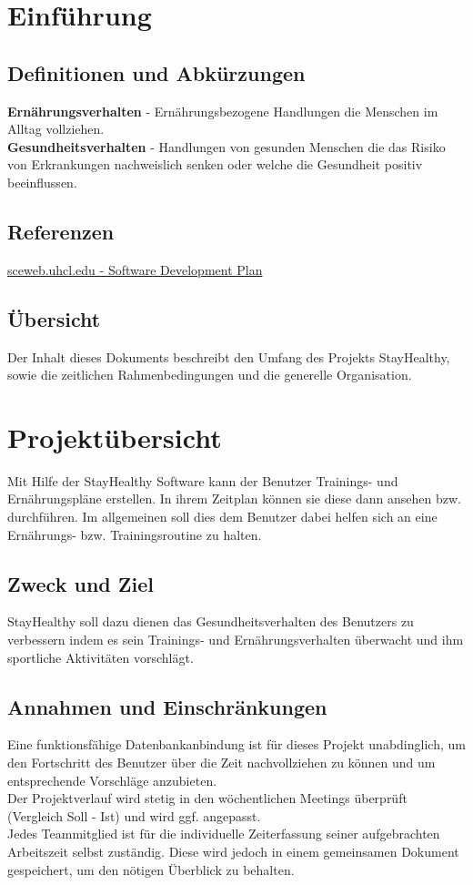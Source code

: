 \documentclass[12pt,a4paper,onecolumn]{article}
\begin{document}
\section{Einführung}
\subsection{Definitionen und Abkürzungen}
\textbf{Ernährungsverhalten} - Ernährungsbezogene Handlungen die Menschen im Alltag vollziehen.\\
\textbf{Gesundheitsverhalten} - Handlungen von gesunden Menschen die das Risiko von Erkrankungen nachweislich senken oder welche die Gesundheit positiv beeinflussen.
\subsection{Referenzen}
\href{https://sceweb.uhcl.edu/helm/RationalUnifiedProcess/webtmpl/templates/mgmnt/rup_sdpln_sp.htm}{sceweb.uhcl.edu - Software Development Plan}
\subsection{Übersicht}
Der Inhalt dieses Dokuments beschreibt den Umfang des Projekts StayHealthy, sowie die zeitlichen Rahmenbedingungen und die generelle Organisation. 
\section{Projektübersicht}
Mit Hilfe der StayHealthy Software kann der Benutzer Trainings- und Ernährungspläne erstellen. In ihrem Zeitplan können sie diese dann ansehen bzw. durchführen. Im allgemeinen soll dies dem Benutzer dabei helfen sich an eine Ernährungs- bzw. Trainingsroutine zu halten. 
\subsection{Zweck und Ziel}
StayHealthy soll dazu dienen das Gesundheitsverhalten des Benutzers zu verbessern indem es sein Trainings- und Ernährungsverhalten überwacht und ihm sportliche Aktivitäten vorschlägt.
\subsection{Annahmen und Einschränkungen}
Eine funktionsfähige Datenbankanbindung ist für dieses Projekt unabdinglich, um den Fortschritt des Benutzer über die Zeit nachvollziehen zu können und um entsprechende Vorschläge anzubieten.\\
Der Projektverlauf wird stetig in den wöchentlichen Meetings überprüft (Vergleich Soll - Ist) und wird ggf. angepasst.\\
Jedes Teammitglied ist für die individuelle Zeiterfassung seiner aufgebrachten Arbeitszeit selbst zuständig. Diese wird jedoch in einem gemeinsamen Dokument gespeichert, um den nötigen Überblick zu behalten.
\end{document}
